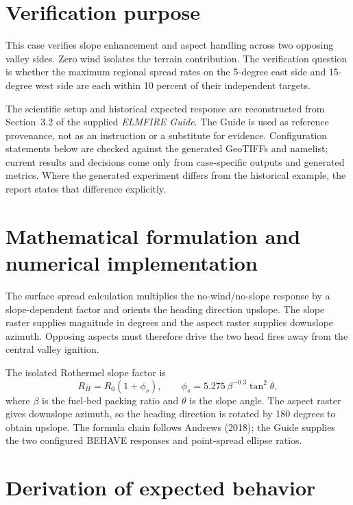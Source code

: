 \section{Verification purpose}

This case verifies slope enhancement and aspect handling across two opposing valley sides.  Zero wind isolates the terrain contribution.  The verification question is whether the maximum regional spread rates on the 5-degree east side and 15-degree west side are each within 10 percent of their independent targets.

The scientific setup and historical expected response are reconstructed from Section~3.2 of the supplied \emph{ELMFIRE Guide}. The Guide is used as reference provenance, not as an instruction or a substitute for evidence. Configuration statements below are checked against the generated GeoTIFFs and namelist; current results and decisions come only from case-specific outputs and generated metrics. Where the generated experiment differs from the historical example, the report states that difference explicitly.

\section{Mathematical formulation and numerical implementation}

The surface spread calculation multiplies the no-wind/no-slope response by a slope-dependent factor and orients the heading direction upslope.  The slope raster supplies magnitude in degrees and the aspect raster supplies downslope azimuth.  Opposing aspects must therefore drive the two head fires away from the central valley ignition.

The isolated Rothermel slope factor is
\begin{equation}
R_H=R_0(1+\phi_s), \qquad \phi_s=5.275\,\beta^{-0.3}\tan^2\theta,
\end{equation}
where \(\beta\) is the fuel-bed packing ratio and \(\theta\) is the slope angle. The aspect raster gives downslope azimuth, so the heading direction is rotated by 180 degrees to obtain upslope. The formula chain follows Andrews (2018); the Guide supplies the two configured BEHAVE responses and point-spread ellipse ratios.

\section{Derivation of expected behavior}

